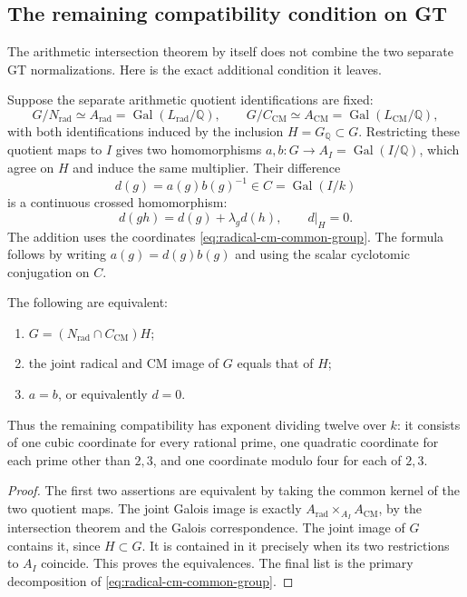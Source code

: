 \subsection{The remaining compatibility condition on GT}

The arithmetic intersection theorem by itself does not combine
the two separate GT normalizations.  Here is the exact additional
condition it leaves.

Suppose the separate arithmetic quotient identifications are fixed:
\[
 G/N_{\mathrm{rad}}\simeq
        A_{\mathrm{rad}}=\operatorname{Gal}(L_{\mathrm{rad}}/\mathbb Q),
 \qquad
 G/C_{\mathrm{CM}}\simeq
        A_{\mathrm{CM}}=\operatorname{Gal}(L_{\mathrm{CM}}/\mathbb Q),
\]
with both identifications induced by the inclusion
$H=G_{\mathbb Q}\subset G$.
Restricting these quotient maps to $I$ gives two homomorphisms
$a,b:G\to A_I=\operatorname{Gal}(I/\mathbb Q)$, which agree on
$H$ and induce the same multiplier.  Their difference
\begin{equation}
 d(g)=a(g)b(g)^{-1}\in C=\operatorname{Gal}(I/k)
 \label{eq:radical-cm-compatibility-defect}
\end{equation}
is a continuous crossed homomorphism:
\[
 d(gh)=d(g)+\lambda_gd(h),\qquad d|_H=0.
\]
The addition uses the coordinates
\eqref{eq:radical-cm-common-group}.
The formula follows by writing $a(g)=d(g)b(g)$ and using the
scalar cyclotomic conjugation on $C$.

\begin{proposition}\label{prop:radical-cm-joint-gate}
The following are equivalent:
\begin{enumerate}
\item $G=(N_{\mathrm{rad}}\cap C_{\mathrm{CM}})H$;
\item the joint radical and CM image of $G$ equals that of $H$;
\item $a=b$, or equivalently $d=0$.
\end{enumerate}
Thus the remaining compatibility has exponent dividing twelve
over $k$: it consists of one cubic coordinate for every rational
prime, one quadratic coordinate for each prime other than $2,3$,
and one coordinate modulo four for each of $2,3$.
\end{proposition}

\begin{proof}
The first two assertions are equivalent by taking the common
kernel of the two quotient maps.
The joint Galois image is exactly
$A_{\mathrm{rad}}\times_{A_I}A_{\mathrm{CM}}$,
by the intersection theorem and the Galois correspondence.
The joint image of $G$ contains it, since $H\subset G$.
It is contained in it precisely when its two restrictions to
$A_I$ coincide.  This proves the equivalences.  The final list
is the primary decomposition of
\eqref{eq:radical-cm-common-group}.
\end{proof}

